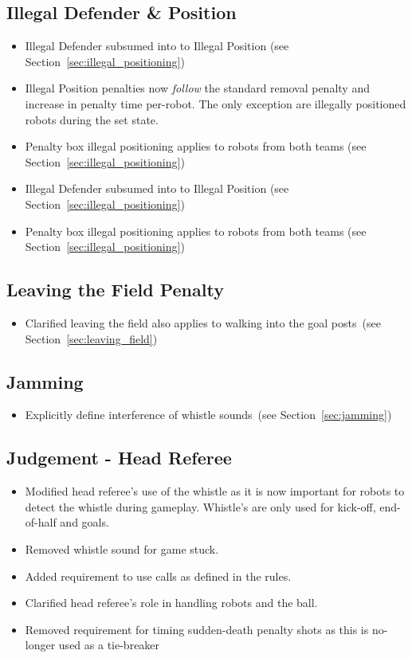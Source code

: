 \documentclass[12pt]{article}
\newcommand{\cf}{see\xspace}
\begin{document}
\subsection*{Illegal Defender \& Position}
\begin{itemize}
  \item Illegal Defender subsumed into to Illegal Position (\cf Section~\ref{sec:illegal_positioning})
  \item Illegal Position penalties now \textit{follow} the standard removal penalty and increase in penalty time per-robot. The only exception are illegally positioned robots during the set state.
  \item Penalty box illegal positioning applies to robots from both teams (\cf Section~\ref{sec:illegal_positioning})
\end{itemize}

\begin{itemize}
  \item Illegal Defender subsumed into to Illegal Position (\cf Section~\ref{sec:illegal_positioning})
  \item Penalty box illegal positioning applies to robots from both teams (\cf Section~\ref{sec:illegal_positioning})
\end{itemize}

\subsection*{Leaving the Field Penalty}
\begin{itemize}
  \item Clarified leaving the field also applies to walking into the goal posts~(\cf Section~\ref{sec:leaving_field})
\end{itemize}

\subsection*{Jamming}
\begin{itemize}
  \item Explicitly define interference of whistle sounds~(\cf Section~\ref{sec:jamming})
\end{itemize}

\subsection*{Judgement - Head Referee}
\begin{itemize}
  \item Modified head referee's use of the whistle as it is now important for robots to detect the whistle during gameplay. Whistle's are only used for kick-off, end-of-half and goals.
  \item Removed whistle sound for game stuck.
  \item Added requirement to use calls as defined in the rules.
  \item Clarified head referee's role in handling robots and the ball.
  \item Removed requirement for timing sudden-death penalty shots as this is no-longer used as a tie-breaker
\end{itemize}
\end{document}
